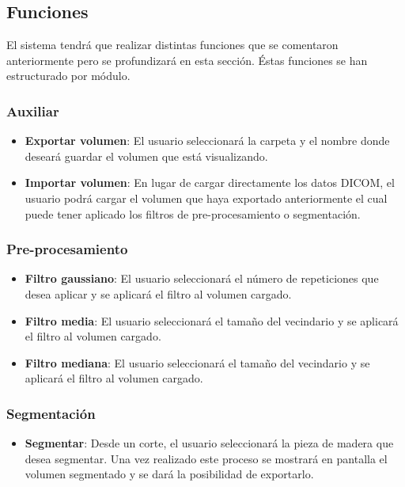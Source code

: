 \subsection{Funciones}

El sistema tendrá que realizar distintas funciones que se comentaron anteriormente pero se profundizará en esta sección. Éstas funciones se han estructurado por módulo.

\subsubsection{Auxiliar}

\begin{itemize}
	\item \textbf{Exportar volumen}: El usuario seleccionará la carpeta y el nombre donde deseará guardar el volumen que está visualizando.
	\item \textbf{Importar volumen}: En lugar de cargar directamente los datos DICOM, el usuario podrá cargar el volumen que haya exportado anteriormente el cual puede tener aplicado los filtros de pre-procesamiento o segmentación.
\end{itemize}

\subsubsection{Pre-procesamiento}

\begin{itemize}
	\item \textbf{Filtro gaussiano}: El usuario seleccionará el número de repeticiones que desea aplicar y se aplicará el filtro al volumen cargado.
	\item \textbf{Filtro media}: El usuario seleccionará el tamaño del vecindario y se aplicará el filtro al volumen cargado.
	\item \textbf{Filtro mediana}: El usuario seleccionará el tamaño del vecindario y se aplicará el filtro al volumen cargado.
\end{itemize}

\subsubsection{Segmentación}

\begin{itemize}
	\item \textbf{Segmentar}: Desde un corte, el usuario seleccionará la pieza de madera que desea segmentar. Una vez realizado este proceso se mostrará en pantalla el volumen segmentado y se dará la posibilidad de exportarlo.
\end{itemize}

